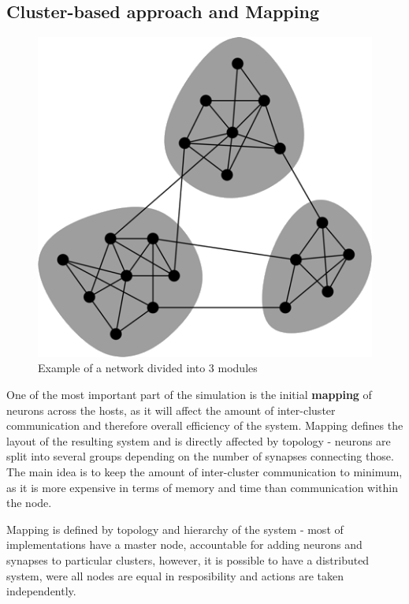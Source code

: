 \subsection{Cluster-based approach and Mapping}

\begin{figure}[h]
\begin{center}
\includegraphics[scale = 0.3]{images/background/modular_division.png}
\end{center}
\caption{Example of a network divided into 3 modules\cite{Newman2006}}
\end{figure}

One of the most important part of the simulation is the initial \textbf{mapping} of neurons across the hosts, as it will affect the amount of inter-cluster communication and therefore overall efficiency of the system. Mapping defines the layout of the resulting system and is directly affected by topology - neurons are split into several groups depending on the number of synapses connecting those. The main idea is to keep the amount of inter-cluster communication to minimum, as it is more expensive in terms of memory and time than communication within the node.

Mapping is defined by topology and hierarchy of the system - most of implementations have a master node, accountable for adding neurons and synapses to particular clusters, however, it is
possible to have a distributed system, were all nodes are equal in resposibility and actions are taken independently.

